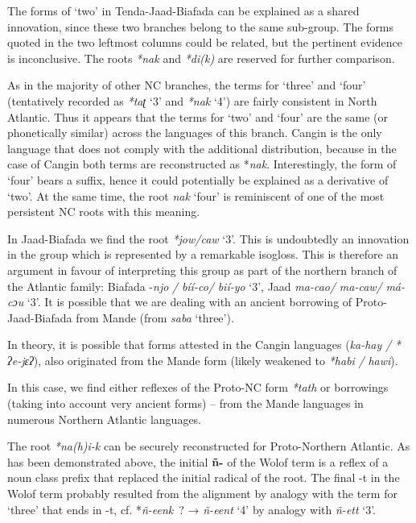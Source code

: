 The forms of ‘two’ in Tenda-Jaad-Biafada can be explained as a shared innovation, since these two branches belong to the same sub-group. The forms quoted in the two leftmost columns could be related, but the pertinent evidence is inconclusive. The roots \textit{*nak} and \textit{*di(k)} are reserved for further comparison.

As in the majority of other NC branches, the terms for ‘three’ and ‘four’ (tentatively recorded as \textit{*taʈ} ‘3’ and \textit{*nak} ‘4’) are fairly consistent in North Atlantic. Thus it appears that the terms for ‘two’ and ‘four’ are the same (or phonetically similar) across the languages of this branch. Cangin is the only language that does not comply with the additional distribution, because in the case of Cangin both terms are reconstructed as *\textit{nak}. Interestingly, the form of ‘four’ bears a suffix, hence it could potentially be explained as a derivative of ‘two’. At the same time, the root \textit{nak} ‘four’ is reminiscent of one of the most persistent NC roots with this meaning. 

In Jaad-Biafada we find the root \textit{*jow/caw} ‘3’. This is undoubtedly an innovation in the group which is represented by a remarkable isogloss. This is therefore an argument in favour of interpreting this group as part of the northern branch of the Atlantic family: Biafada -\textit{njo} \textit{/} \textit{bíí-co/}  \textit{bií-yo} ‘3’, Jaad \textit{ma-cao/}  \textit{ma-caw/}  \textit{má-cɔu}  ‘3’. It is possible that we are dealing with an ancient borrowing of Proto-Jaad-Biafada from Mande (from \textit{saba} ‘three’).

In theory, it is possible that forms attested in the Cangin languages (\textit{ka-hay} \textit{/} \textit{*} \textit{ʔe-jɛʔ}), also originated from the Mande form (likely weakened to \textit{*habi} \textit{/} \textit{hawi}).

In this case, we find either reflexes of the Proto-NC form \textit{*tath} or borrowings (taking into account very ancient forms) – from the Mande languages in numerous Northern Atlantic languages.


The root \textit{*na}\textit{(h}\textit{)i}\textit{-}\textit{k} can be securely reconstructed for Proto-Northern Atlantic. As has been demonstrated above, the initial \textbf{ñ-} of the Wolof term is a reflex of a noun class prefix that replaced the initial radical of the root. The final -t in the Wolof term probably resulted from the alignment by analogy with the term for ‘three’ that ends in -t, cf.  *\textit{ñ-eenk}~? → \textit{ñ-eent} ‘4’ by analogy with \textit{ñ-ett} ‘3’.

